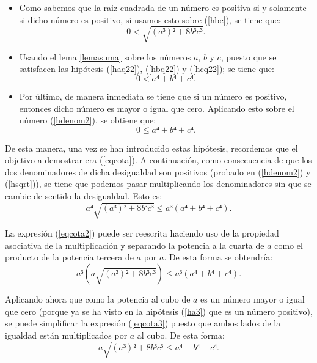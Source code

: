 \begin{demostracion}
\begin{itemize}
   \item Como sabemos que la raiz cuadrada de un número es positiva si
     y solamente si dicho número es positivo, si usamos esto sobre
     (\ref{hbc}), se tiene que:
     \begin{equation}\label{hsqrt}\tag{hsqrt}
       0<\sqrt{(a³)²+8b³c³}.
     \end{equation}

   \item Usando el lema \ref{lemasuma} sobre los números \(a\), \(b\) y
     \(c\), puesto que se satisfacen las hipótesis (\ref{haq22}),
     (\ref{hbq22}) y (\ref{hcq22}); se tiene que:
     \begin{equation}\label{hdenom2}\tag{hdenom2}
       0<a⁴+b⁴+c⁴.
     \end{equation}

   \item Por último, de manera inmediata se tiene que si un número es
     positivo, entonces dicho número es mayor o igual que cero. Aplicando
     esto sobre el número (\ref{hdenom2}), se obtiene que:
     \begin{equation}\label{hdenom3}\tag{hdenom3}
       0≤a⁴+b⁴+c⁴.
     \end{equation}
  \end{itemize}

  De esta manera, una vez se han introducido estas hipótesis, recordemos
  que el objetivo a demostrar era (\ref{eqcota}). A continuación, como
  consecuencia de que los dos denominadores de dicha desigualdad son
  positivos (probado en (\ref{hdenom2}) y (\ref{hsqrt})), se tiene que
  podemos pasar multiplicando los denominadores sin que se cambie de
  sentido la desigualdad. Esto es:
  \begin{equation}\label{eqcota2}
    a⁴ \sqrt{(a³)²+8b³c³}≤ a³ (a⁴+b⁴+c⁴).
  \end{equation}

  La expresión (\ref{eqcota2}) puede ser reescrita haciendo uso de la
  propiedad asociativa de la multiplicación y separando la potencia a la
  cuarta de \(a\) como el producto de la potencia tercera de \(a\) por
  \(a\). De esta forma se obtendría:
  \begin{equation}\label{eqcota3}
    a³(a \sqrt{(a³)²+8b³c³})≤ a³ (a⁴+b⁴+c⁴).
  \end{equation}

  Aplicando ahora que como la potencia al cubo de \(a\) es un número mayor
  o igual que cero (porque ya se ha visto en la hipótesis (\ref{ha3}) que es
  un número positivo), se puede simplificar la expresión (\ref{eqcota3})
  puesto que ambos lados de la igualdad están multiplicados por \(a\) al
  cubo. De esta forma:
  \begin{equation}\label{eqcota4}
    a \sqrt{(a³)²+8b³c³}≤a⁴+b⁴+c⁴.
  \end{equation}


\end{demostracion}
